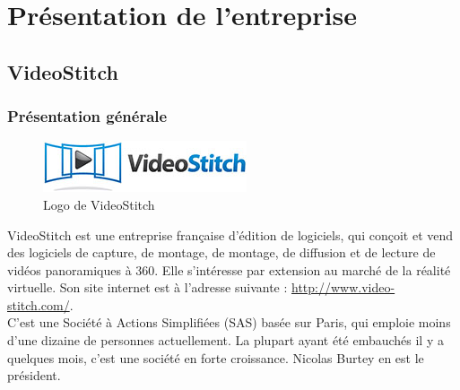 \chapter{Présentation de l'entreprise}

\section{VideoStitch}
\subsection{Présentation générale}
\begin{figure}
  \centering
  \includegraphics[width=6cm]{images/videostitch-logo.jpg}
  \caption{Logo de VideoStitch}
\end{figure}
VideoStitch est une entreprise française d'édition de logiciels, qui conçoit et 
vend des logiciels de capture, de montage, de montage, de diffusion et de lecture 
de vidéos panoramiques à 360\degree. Elle s'intéresse par extension au marché de 
la réalité virtuelle.
Son site internet est à l'adresse suivante : \url{http://www.video-stitch.com/}.\\
C'est une Société à Actions Simplifiées (SAS) basée sur Paris, qui emploie moins
d'une dizaine de personnes actuellement. La plupart ayant été embauchés il y a 
quelques mois, c'est une société en forte croissance. 
Nicolas Burtey en est le président.

